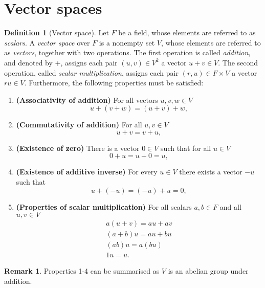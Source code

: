 \documentclass[12pt]{article}
\theoremstyle{definition}
\newtheorem{definition}[theorem]{Definition}
\newtheorem*{remark}{Remark}
\begin{document}
\section{Vector spaces}
\begin{definition}[Vector space]
Let $F$ be a field, whose elements are referred to as \textit{scalars}. A \textit{vector space} over $F$ is a nonempty set $V$, whose elements are referred to as \textit{vectors}, together with two operations. The first operation is called \textit{addition}, and denoted by $+$, assigns each pair $(u,v)\in V^2$ a vector $u+v\in V$. The second operation, called \textit{scalar multiplication}, assigns each pair $(r,u)\in F\times V$ a vector $ru\in V$. Furthermore, the following properties must be satisfied:
\begin{enumerate}
    \item \textbf{(Associativity of addition)} For all vectors $u,v,w\in V$
    \begin{equation*}
        u+(v+w)=(u+v)+w,
    \end{equation*}
    \item \textbf{(Commutativity of addition)} For all $u,v\in V$
    \begin{equation*}
        u+v=v+u,
    \end{equation*}
    \item \textbf{(Existence of zero)} There is a vector $0\in V$ such that for all $u\in V$
    \begin{equation*}
        0+u=u+0=u,
    \end{equation*}
    \item \textbf{(Existence of additive inverse)} For every $u\in V$ there exists a vector $-u$ such that
    \begin{equation*}
        u+(-u)=(-u)+u=0,
    \end{equation*}
    \item \textbf{(Properties of scalar multiplication)} For all scalars $a,b\in F$ and all $u,v\in V$
    \begin{gather*}
        a(u+v)=au+av\\
        (a+b)u=au+bu\\
        (ab)u=a(bu)\\
        1u=u.
    \end{gather*}
\end{enumerate}
\end{definition}
\begin{remark}
    Properties 1-4 can be summarised as $V$ is an abelian group under addition.
\end{remark}
\end{document}
